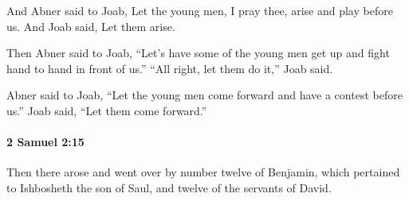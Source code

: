 			\begin{versebox}
					\item[BHS] 
					\item[ASV] And Abner said to Joab, Let the young men, I pray thee, arise and play before us. And Joab said, Let them arise.
					\item[NIV] Then Abner said to Joab, “Let’s have some of the young men get up and fight hand to hand in front of us.” “All right, let them do it,” Joab said.
					\item[NRSV] Abner said to Joab, “Let the young men come forward and have a contest before us.” Joab said, “Let them come forward.”
			\end{versebox}

		\paragraph{2 Samuel 2:15} %
			\label{2SAMUEL-2-15}

			Then there arose and went over by number twelve of Benjamin, which pertained to Ishbosheth the son of Saul, and twelve of the servants of David.

